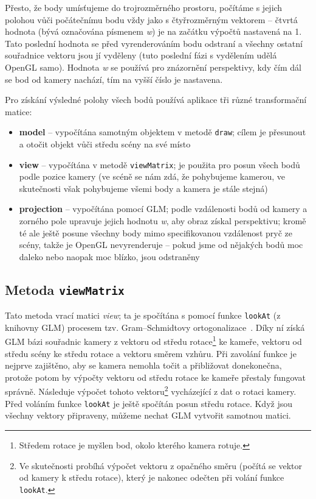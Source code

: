 \documentclass[a4paper, 11pt]{report}
\begin{document}
Přesto, že body umísťujeme do trojrozměrného prostoru, počítáme s jejich polohou vůči počátečnímu bodu vždy jako s čtyřrozměrným vektorem -- čtvrtá hodnota (bývá označována písmenem \emph{w}) je na začátku výpočtů nastavená na 1. Tato poslední hodnota se před vyrenderováním bodu odstraní a všechny ostatní souřadnice vektoru jsou jí vyděleny (tuto poslední fázi s vydělením udělá OpenGL samo). Hodnota \emph{w} se používá pro znázornění perspektivy, kdy čím dál se bod od kamery nachází, tím na vyšší číslo je nastavena.

\begin{minipage}{\textwidth}
Pro získání výsledné polohy všech bodů používá aplikace tři různé transformační matice:
\begin{itemize}
    \item \textbf{model} -- vypočítána samotným objektem v metodě \texttt{draw}; cílem je přesunout a otočit objekt vůči středu scény na své místo
    \item \textbf{view} -- vypočítána v metodě \texttt{viewMatrix}; je použita pro posun všech bodů podle pozice kamery (ve scéně se nám zdá, že pohybujeme kamerou, ve skutečnosti však pohybujeme všemi body a kamera je stále stejná)
    \item \textbf{projection} -- vypočítána pomocí GLM; podle vzdálenosti bodů od kamery a zorného pole upravuje jejich hodnotu \emph{w}, aby obraz získal perspektivu; kromě té ale ještě posune všechny body mimo specifikovanou vzdálenost pryč ze scény, takže je OpenGL nevyrenderuje -- pokud jsme od nějakých bodů moc daleko nebo naopak moc blízko, jsou odstraněny
\end{itemize}
\end{minipage}

\subsection{Metoda \texttt{viewMatrix}}
Tato metoda vrací matici \emph{view}; ta je spočítána s pomocí funkce \texttt{lookAt} (z knihovny GLM) procesem tzv. Gram–Schmidtovy ortogonalizace~\cite{libre:ortogonalizace}. Díky ní získá GLM bázi souřadnic kamery z vektoru od středu rotace\footnote{\label{rotace}Středem rotace je myšlen bod, okolo kterého kamera rotuje.} ke kameře, vektoru od středu scény ke středu rotace a vektoru směrem vzhůru. Při zavolání funkce je nejprve zajištěno, aby se kamera nemohla točit a přibližovat donekonečna, protože potom by výpočty vektoru od středu rotace ke kameře přestaly fungovat správně. Následuje výpočet tohoto vektoru\footnote{Ve skutečnosti probíhá výpočet vektoru z opačného směru (počítá se vektor od kamery k středu rotace), který je nakonec odečten při volání funkce \texttt{lookAt}.} vycházející z dat o rotaci kamery. Před voláním funkce \texttt{lookAt} je ještě spočítán posun středu rotace. Když jsou všechny vektory připraveny, můžeme nechat GLM vytvořit samotnou matici.
\end{document}
